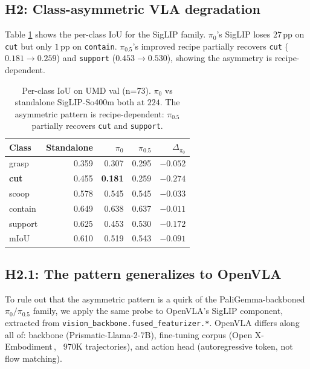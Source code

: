 \documentclass[10pt]{article}
\begin{document}
\subsection{H2: Class-asymmetric VLA degradation}

Table \ref{tab:h2_perclass} shows the per-class IoU for the SigLIP family.
$\pi_0$'s SigLIP loses $27$\,pp on \texttt{cut} but only $1$\,pp on
\texttt{contain}. $\pi_{0.5}$'s improved recipe partially recovers
\texttt{cut} ($0.181 \to 0.259$) and \texttt{support} ($0.453 \to 0.530$),
showing the asymmetry is recipe-dependent.

\begin{table}[ht]
\centering
\small
\begin{tabular}{lrrrr}
\toprule
Class & Standalone & $\pi_0$ & $\pi_{0.5}$ & $\Delta_{\pi_0}$ \\
\midrule
grasp & 0.359 & 0.307 & 0.295 & $-0.052$ \\
\textbf{cut} & 0.455 & \textbf{0.181} & 0.259 & $\mathbf{-0.274}$ \\
scoop & 0.578 & 0.545 & 0.545 & $-0.033$ \\
contain & 0.649 & 0.638 & 0.637 & $-0.011$ \\
support & 0.625 & 0.453 & 0.530 & $-0.172$ \\
\midrule
mIoU & 0.610 & 0.519 & 0.543 & $-0.091$ \\
\bottomrule
\end{tabular}
\caption{Per-class IoU on UMD val (n=73). $\pi_0$ vs standalone SigLIP-So400m
both at $224$. The asymmetric pattern is recipe-dependent: $\pi_{0.5}$
partially recovers \texttt{cut} and \texttt{support}.}
\label{tab:h2_perclass}
\end{table}

\subsection{H2.1: The pattern generalizes to OpenVLA}

To rule out that the asymmetric pattern is a quirk of the
PaliGemma-backboned $\pi_0/\pi_{0.5}$ family, we apply the same probe to
OpenVLA's SigLIP component, extracted from
\texttt{vision\_backbone.fused\_featurizer.*}. OpenVLA differs along all of:
backbone (Prismatic-Llama-2-7B), fine-tuning corpus (Open
X-Embodiment\,\cite{padalkar2024oxe}, ~970K trajectories), and action head
(autoregressive token, not flow matching).
\end{document}
